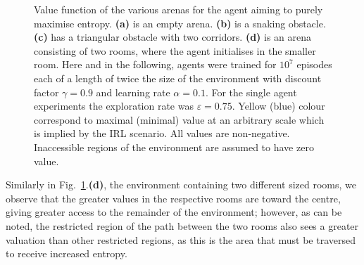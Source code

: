 \documentclass{article}
\begin{document}
\begin{figure}[ht]
\centering
{}
\caption{Value function of the various arenas for the agent aiming to purely maximise entropy. 
\textbf{(a)} is an empty arena. \textbf{(b)} is a snaking obstacle. \textbf{(c)} has a triangular obstacle with two corridors. \textbf{(d)} is an arena consisting of two rooms, where the agent initialises in the smaller room.\label{entfigs}
Here and in the following, agents were trained for $10^7$ episodes each of a length of 
twice the size of the environment with discount factor $\gamma=0.9$ and 
learning rate $\alpha=0.1$. 
For the single agent experiments the exploration rate was $\varepsilon=0.75$. 
	Yellow (blue) colour correspond to maximal (minimal) value at an 
arbitrary scale which is implied by the IRL scenario. 
	All values are non-negative. Inaccessible regions of the environment 
are assumed to have zero value.}
\end{figure}

Similarly in Fig.~\ref{entfigs}.\textbf{(d)}, the environment containing two different sized rooms, we observe that the greater values in the respective rooms are toward the centre, giving greater access to the remainder of the environment; however, as can be noted, the restricted region of the path between the two rooms also sees a greater valuation than other restricted regions, as this is the area that must be traversed to receive increased entropy.
\end{document}
